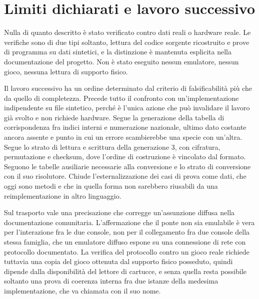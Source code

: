 \documentclass[11pt,a4paper]{article}
\begin{document}
\section{Limiti dichiarati e lavoro successivo}

Nulla di quanto descritto è stato verificato contro dati reali o hardware reale. Le verifiche sono di due tipi soltanto, lettura del codice sorgente ricostruito e prove di programma su dati sintetici, e la distinzione è mantenuta esplicita nella documentazione del progetto. Non è stato eseguito nessun emulatore, nessun gioco, nessuna lettura di supporto fisico.

Il lavoro successivo ha un ordine determinato dal criterio di falsificabilità più che da quello di completezza. Precede tutto il confronto con un'implementazione indipendente su file sintetico, perché è l'unica azione che può invalidare il lavoro già svolto e non richiede hardware. Segue la generazione della tabella di corrispondenza fra indici interni e numerazione nazionale, ultimo dato costante ancora assente e punto in cui un errore scambierebbe una specie con un'altra. Segue lo strato di lettura e scrittura della generazione 3, con cifratura, permutazione e checksum, dove l'ordine di costruzione è vincolato dal formato. Seguono le tabelle ausiliarie necessarie alla conversione e lo strato di conversione con il suo risolutore. Chiude l'esternalizzazione dei casi di prova come dati, che oggi sono metodi e che in quella forma non sarebbero riusabili da una reimplementazione in altro linguaggio.

Sul trasporto vale una precisazione che corregge un'assunzione diffusa nella documentazione comunitaria. L'affermazione che il ponte non sia emulabile è vera per l'interazione fra le due console, non per il collegamento fra due console della stessa famiglia, che un emulatore diffuso espone su una connessione di rete con protocollo documentato. La verifica del protocollo contro un gioco reale richiede tuttavia una copia del gioco ottenuta dal supporto fisico posseduto, quindi dipende dalla disponibilità del lettore di cartucce, e senza quella resta possibile soltanto una prova di coerenza interna fra due istanze della medesima implementazione, che va chiamata con il suo nome.
\end{document}
